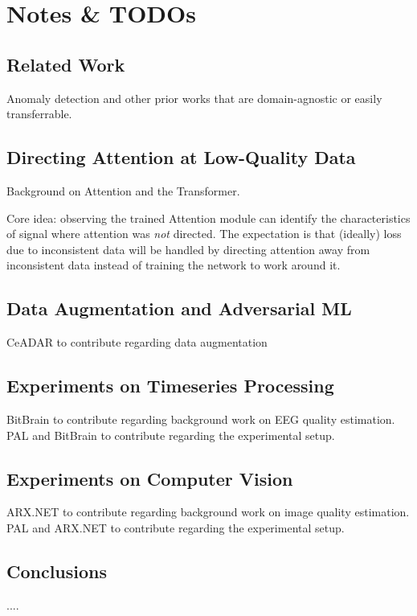 \section*{Notes \& TODOs}

\subsection{Related Work}

Anomaly detection and other prior works that are domain-agnostic or
easily transferrable.

\subsection{Directing Attention at Low-Quality Data}
Background on Attention and the Transformer.

Core idea: observing the trained Attention module can identify the
characteristics of signal where attention was \emph{not} directed.
The expectation is that (ideally) loss due to inconsistent data will
be handled by directing attention away from inconsistent data instead
of training the network to work around it.

\subsection{Data Augmentation and Adversarial ML}

%
{CeADAR to contribute regarding data augmentation}

\subsection{Experiments on Timeseries Processing}

%
{BitBrain to contribute regarding background work on EEG quality estimation. PAL and BitBrain to contribute regarding the experimental setup.}

\subsection{Experiments on Computer Vision}

%
{ARX.NET to contribute regarding background work on image quality estimation. PAL and ARX.NET to contribute regarding the experimental setup.}

\subsection{Conclusions}
....
